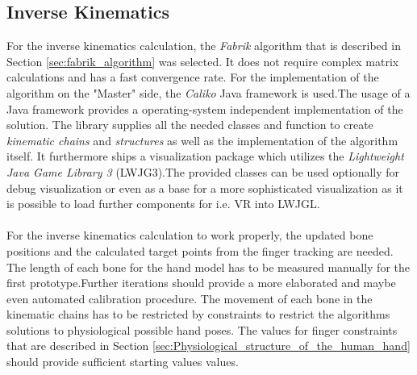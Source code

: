 \subsection{Inverse Kinematics}
For the inverse kinematics calculation, the \textit{Fabrik} algorithm that is described in Section \ref{sec:fabrik_algorithm} was selected. It does not require complex matrix calculations and has a fast convergence rate. For the implementation of the algorithm on the "Master" side, the \textit{Caliko} Java framework\cite{Lansley.2016} is used.The usage of a Java framework provides a operating-system independent implementation of the solution. The library supplies all the needed classes and function to create \textit{kinematic chains} and \textit{structures} as well as the implementation of the algorithm itself. It furthermore ships a visualization package which utilizes the \textit{Lightweight Java Game Library 3} (LWJG3).The provided classes can be used optionally for debug visualization or even as a base for a more sophisticated visualization as it is possible to load further components for i.e. VR into LWJGL.\\\\
For the inverse kinematics calculation to work properly, the updated bone positions and the calculated target points from the finger tracking are needed.
The length of each bone for the hand model has to be measured manually for the first prototype.Further iterations should provide a more elaborated and maybe even automated calibration procedure. The movement of each bone in the kinematic chains has to be restricted by constraints to restrict the algorithms solutions to physiological possible hand poses. The values for finger constraints that are described in Section \ref{sec:Physiological_structure_of_the_human_hand} should provide sufficient starting values values. 